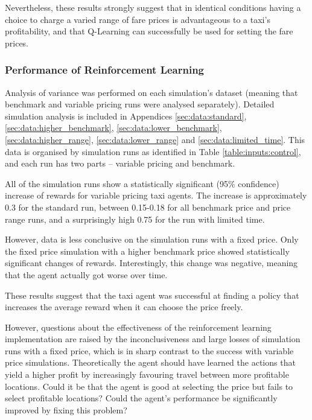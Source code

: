 Nevertheless, these results strongly suggest that in identical conditions
having a choice to charge a varied range of fare prices is advantageous to a
taxi's profitability, and that Q-Learning can successfully be used for setting
the fare prices.


\subsubsection{Performance of Reinforcement Learning}
\label{sec:results:stats}

Analysis of variance was performed on each simulation's dataset (meaning that
benchmark and variable pricing runs were analysed separately). Detailed
simulation analysis is included in Appendices \ref{sec:data:standard},
\ref{sec:data:higher_benchmark}, \ref{sec:data:lower_benchmark},
\ref{sec:data:higher_range}, \ref{sec:data:lower_range} and
\ref{sec:data:limited_time}. This data is organised by simulation runs as
identified in Table \ref{table:inputs:control}, and each run has two parts --
variable pricing and benchmark.

All of the simulation runs show a statistically significant (95\% confidence)
increase of rewards for variable pricing taxi agents. The increase is
approximately 0.3 for the standard run, between 0.15-0.18 for all benchmark
price and price range runs, and a surprisingly high 0.75 for the run with
limited time.

However, data is less conclusive on the simulation runs with a fixed price.
Only the fixed price simulation with a higher benchmark price showed
statistically significant changes of rewards. Interestingly, this change was
negative, meaning that the agent actually got worse over time.

These results suggest that the taxi agent was successful at finding a policy
that increases the average reward when it can choose the price freely. 

However, questions about the effectiveness of the reinforcement learning
implementation are raised by the inconclusiveness and large losses of simulation
runs with a fixed price, which is in sharp contrast to the success with
variable price simulations. Theoretically the agent should have learned the
actions that yield a higher profit by increasingly favouring travel between
more profitable locations. Could it be that the agent is good at selecting the
price but fails to select profitable locations? Could the agent's performance
be significantly improved by fixing this problem?
